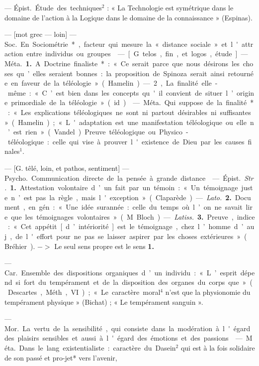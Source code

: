 \begin{itemize}[leftmargin=1cm, label=, itemsep=1pt]
 — \si{Épist.} Étude des
techniques$^2$ : « La Technologie est
symétrique dans le domaine de
l’action à la Logique dans le domaine
de la connaissance » (Espinas).

 — [mot grec — loin] — \si{Soc.} En
Sociométrie*, facteur qui mesure la
« distance sociale » et l'attraction
entre individus ou groupes.

 — [G. telos, fin, et logos, étude]
— \si{Méta.} {\bf 1.} A. Doctrine finaliste* :
« Ce serait parce que nous désirons
les choses qu’elles seraient bonnes :
la proposition de Spinoza serait
ainsi retournée en faveur de la téléologie » (Hamelin). — 2, La finalité
elle-même : « C’est bien dans les
concepts qu'il convient de situer
l’origine primordiale de la téléologie » (id.).

 — \si{Méta.} Qui suppose de
la finalité* : « Les explications téléologiques ne sont ni partout désirables ni suffisantes » (Hamelin) ;
« L'adaptation est une manifestation téléologique ou elle n’est rien »
(Vandel). Preuve téléologique ou
Physico-téléologique : celle qui vise
à prouver l'existence de Dieu par
les causes finales$^1$.

 — [G. têlé, loin, et pathos, sentiment] — \si{Psycho.} Communication
directe de la pensée à grande distance.

 — \si{Épist.} {\it Str.} {\bf 1.} Attestation volontaire d’un fait par un
témoin : « Un témoignage juste
n’est pas la règle, mais l'exception »
(Claparède). — {\it Lato.} {\bf 2.} Document,
en gén. : « Une idée surannée : celle
du temps où l’on ne savait lire que
les témoignages volontaires »
(M. Bloch). — {\it Latiss.} {\bf 3.} Preuve,
indice : « Cet appétit [d’intériorité]
est le témoignage, chez l’homme
d’auj., de l'effort pour ne pas se
laisser aspirer par les choses extérieures » (Bréhier). $->$ Le seul sens
propre est le sens {\bf 1.}

 — \si{Car.} Ensemble des
dispositions organiques d’un individu : « L’esprit dépend si fort du
tempérament et de la disposition
des organes du corps que... » (Descartes, Méth., VI) ; « Le caractère
moral$^4$ n’est que la physionomie du
tempérament physique » (Bichat) ;
« Le tempérament sanguin ».

 — \si{Mor.} La vertu de la
sensibilité, qui consiste dans la modération à l'égard des plaisirs sensibles et aussi à l'égard des émotions
et des passions.

 — \si{Méta.} Dans le lang.
existentialiste : caractère du Dasein$^2$
qui est à la fois solidaire de son
passé et pro-jet* vers l'avenir,


\end{itemize}
